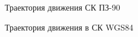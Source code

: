 \documentclass[]{article}
\begin{document}
	\begin{figure}[h!]
		
		\caption{Траектория движения  СК ПЗ-90 }
		\label{PZ}
	\end{figure}
	
	\begin{figure}[h!]
		
		\caption{Траектория движения в СК WGS84  }
		\label{WGS}
	\end{figure}
	
\end{document}
